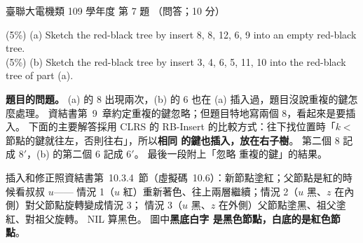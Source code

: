 \begin{pastexam}[label={px:ust-109-ee-ds-07}]{臺聯大電機類 109 學年度 第 7 題}
（問答；10 分）

(5\%) (a) Sketch the red-black tree by insert 8, 8, 12, 6, 9 into an empty red-black tree.\\
(5\%) (b) Sketch the red-black tree by insert 3, 4, 6, 5, 11, 10 into the red-black tree of part (a).
\end{pastexam}

\begin{pastsoln}
\textbf{題目的問題。} (a) 的 $8$ 出現兩次，(b) 的 $6$ 也在 (a) 插入過，題目沒說重複的鍵怎麼處理。
資結書第~9~章約定重複的鍵忽略；但題目特地寫兩個 $8$，看起來是要插入。 下面的主要解答採用
CLRS 的 RB-Insert 的比較方式：往下找位置時「$k <$ 節點的鍵就往左，否則往右」，所以\textbf{相同
的鍵也插入，放在右子樹}。 第二個 $8$ 記成 $8'$，(b) 的第二個 $6$ 記成 $6'$。 最後一段附上「忽略
重複的鍵」的結果。

插入和修正照資結書第~10.3.4~節（虛擬碼~10.6）：新節點塗紅；父節點是紅的時候看叔叔 $u$——
情況 1（$u$ 紅）重新著色、往上兩層繼續；情況 2（$u$ 黑、$z$ 在內側）對父節點旋轉變成情況 3；
情況 3（$u$ 黑、$z$ 在外側）父節點塗黑、祖父塗紅、對祖父旋轉。 NIL 算黑色。 圖中\textbf{黑底白字
是黑色節點，白底的是紅色節點}。


\end{pastsoln}
